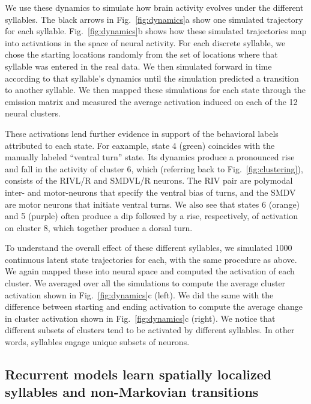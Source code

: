 \documentclass[11pt]{article}
\begin{document}
We use these dynamics to simulate how brain activity evolves under the
different syllables. The black arrows in Fig.~\ref{fig:dynamics}a show
one simulated trajectory for each syllable. Fig.~\ref{fig:dynamics}b
shows how these simulated trajectories map into activations in the
space of neural activity. For each discrete
syllable, we chose the starting locations randomly from the set of
locations where that syllable was entered in the real data.  We then
simulated forward in time according to that syllable's dynamics until
the simulation predicted a transition to another syllable.  We then
mapped these simulations for each state through the emission
matrix and measured the average activation induced on each of the 12
neural clusters.

These activations lend further evidence in support of the behavioral
labels attributed to each state. For eaxample, state 4 (green)
coincides with the manually labeled ``ventral turn'' state.  Its
dynamics produce a pronounced rise and fall in the activity of cluster 6, which
(referring back to Fig.~\ref{fig:clustering}), consists of the
\textsf{RIVL/R} and \textsf{SMDVL/R} neurons.  The \textsf{RIV} pair
are polymodal inter- and motor-neurons that specify the ventral bias
of turns, and the \textsf{SMDV} are motor neurons that initiate
ventral turns.  We also see that states 6 (orange) and 5 (purple) often
produce a dip followed by a rise, respectively, of activation on cluster 8,
which together produce a dorsal turn.

To understand the overall effect of these different syllables, we
simulated 1000 continuous latent state trajectories for each, with
the same procedure as above.  We again mapped these into neural space
and computed the activation of each cluster.  We averaged over all
the simulations to compute the average cluster activation shown in
Fig.~\ref{fig:dynamics}c (left).  We did the same with the difference
between starting and ending activation to compute the average change
in cluster activation shown in Fig.~\ref{fig:dynamics}c (right).
We notice that different subsets of clusters tend
to be activated by different syllables.  In other words, syllables
engage unique subsets of neurons. 

\subsection*{Recurrent models learn spatially localized syllables and non-Markovian transitions}
\end{document}
